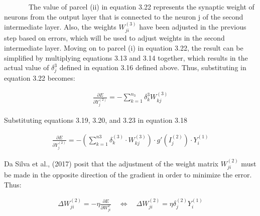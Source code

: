 \documentclass[
  12pt,
]{report}
\begin{document}
~~~~~~~The value of parcel (ii) in equation 3.22 represents the synaptic
weight of neurons from the output layer that is connected to the neuron
j of the second intermediate layer. Also, the weights \(W_{ji}^{(3)}\)
have been adjusted in the previous step based on errors, which will be
used to adjust weights in the second intermediate layer. Moving on to
parcel (i) in equation 3.22, the result can be simplified by multiplying
equations 3.13 and 3.14 together, which results in the actual value of
\(δ_j^3\) defined in equation 3.16 defined above. Thus, substituting in
equation 3.22 becomes:

\vspace{-1em}

\begin{equation}
\begin{aligned}
\frac{\partial E}{\partial Y_j^{(2)}} = - \sum_{k=1}^{n_3} \delta_k^3 W_{kj}^{(3)}
\label{eq:equation 3.24}
\end{aligned}
\end{equation} \vspace{-1em}

Substituting equations 3.19, 3.20, and 3.23 in equation 3.18

\vspace{-1em}

\begin{equation}
\begin{aligned}
\frac{\partial E}{\partial Y_j^{(2)}} = -\left( \sum_{k=1}^{n3} \delta_k^{(3)} \cdot W_{kj}^{(3)} \right) \cdot g'(I_j^{(2)}) \cdot Y_i^{(1)}
\label{eq:equation 3.25}
\end{aligned}
\end{equation} \vspace{-1em}

Da Silva et al., (2017) posit that the adjustment of the weight matrix
\(W_{ji}^{(2)}\) must be made in the opposite direction of the gradient
in order to minimize the error. Thus:

\vspace{-1em}

\begin{equation}
\begin{aligned}
\Delta W_{ji}^{(2)} = - \eta \frac{\partial E}{\partial W_{ji}^2} \quad \iff \quad \Delta W_{ji}^{(2)} = \eta \delta_j^{(2)} Y_i^{(1)}
\label{eq:equation 3.26}
\end{aligned}
\end{equation} \vspace{-1em}
\end{document}
